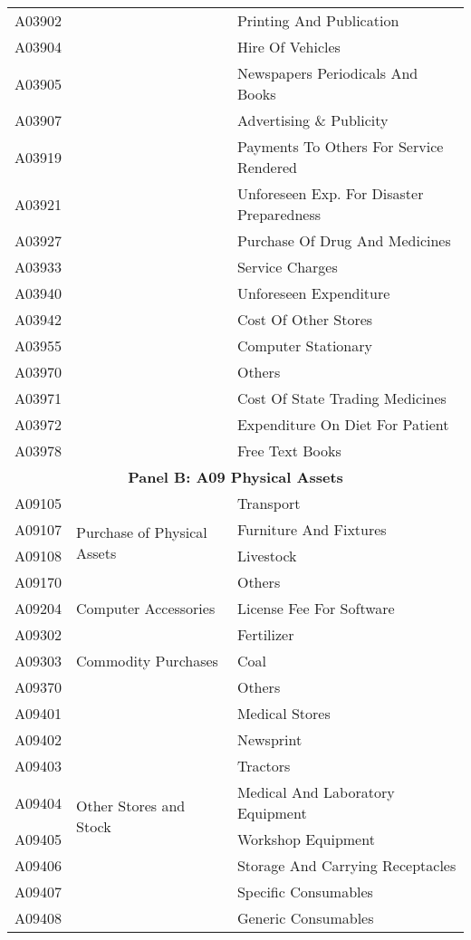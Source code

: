 \begin{longtable}{lll}
	A03902 & & Printing And Publication \\ 
	A03904 & & Hire Of Vehicles \\ 
	A03905 & & Newspapers Periodicals And Books \\ 
	A03907 & & Advertising \& Publicity \\ 
	A03919 & & Payments To Others For Service Rendered \\ 
	A03921 & & Unforeseen Exp. For Disaster Preparedness \\ 
	A03927 & & Purchase Of Drug And Medicines \\ 
	A03933 & & Service Charges \\ 
	A03940 & & Unforeseen Expenditure \\ 
	A03942 & & Cost Of Other Stores \\ 
	A03955 & & Computer Stationary \\ 
	A03970 & & Others \\ 
	A03971 & & Cost Of State Trading Medicines \\ 
	A03972 & & Expenditure On Diet For Patient \\ 
	A03978 & & Free Text Books \\ \midrule
	\multicolumn{3}{c}{\textbf{Panel B: A09 Physical Assets}} \\ \midrule
	A09105 & \multirow{4}{*}{Purchase of Physical Assets} & Transport \\ 
	A09107 & & Furniture And Fixtures \\ 
	A09108 & & Livestock \\ 
	A09170 & & Others \\  \midrule
	A09204 & Computer Accessories & License Fee For Software \\  \midrule
	A09302 & \multirow{3}{*}{Commodity Purchases} & Fertilizer \\ 
	A09303 & & Coal \\ 
	A09370 & & Others \\ \midrule
	A09401 & \multirow{15}{*}{Other Stores and Stock} & Medical Stores \\ 
	A09402 & & Newsprint \\ 
	A09403 & & Tractors \\ 
	A09404 & & Medical And Laboratory Equipment \\ 
	A09405 & & Workshop Equipment \\ 
	A09406 & & Storage And Carrying Receptacles \\ 
	A09407 & & Specific Consumables \\ 
	A09408 & & Generic Consumables \\ 

\end{longtable}
